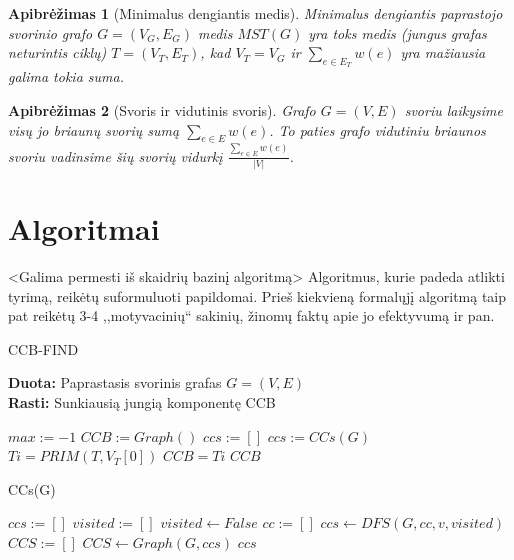 \documentclass[bibliography=totoc]{article}
\newtheorem{definition}{Apibrėžimas}
\begin{document}
\begin{definition}[Minimalus dengiantis medis]\citep{Graf}
Minimalus dengiantis paprastojo svorinio grafo $G=(V_G, E_G)$ medis $MST(G)$ yra toks medis (jungus grafas neturintis ciklų) $T=(V_T, E_T)$, kad $V_T=V_G$ ir $\sum_{e\in E_T}{w(e)}$ yra mažiausia galima tokia suma.
\end{definition}

\begin{definition}[Svoris ir vidutinis svoris]
Grafo $G=(V,E)$ svoriu laikysime visų jo briaunų svorių sumą $\sum_{e\in E}{w(e)}$. To paties grafo vidutiniu briaunos svoriu vadinsime šių svorių vidurkį $\frac{\sum_{e\in E}{w(e)}}{\vert V \vert}$.
\end{definition}
\newpage
\section{Algoritmai}
<Galima permesti iš skaidrių bazinį algoritmą>
Algoritmus, kurie padeda atlikti tyrimą, reikėtų suformuluoti papildomai. 
Prieš kiekvieną formalųjį algoritmą taip pat reikėtų 3-4 ,,motyvacinių`` sakinių,
žinomų faktų apie jo efektyvumą ir pan.


\begin{algorithm}[h]
    \caption{CCB-FIND}
    \textbf{Duota:} Paprastasis svorinis grafas $G=(V,E)$\\
    \textbf{Rasti:} Sunkiausią jungią komponentę CCB
    \begin{algorithmic}[1]
        \STATE $max := -1$
        \STATE $CCB := Graph()$
        \STATE $ccs := []$
        \STATE $ccs := CCs(G)$
            \STATE $Ti = PRIM(T,V_T[0])$
                \STATE $CCB = Ti$
            \ENDIF
        \ENDFOR
        \RETURN $CCB$
    \end{algorithmic}
\end{algorithm}

\begin{algorithm}[h]\citep{slides}
    \caption{CCs(G)}
    \begin{algorithmic}[1]
        \STATE $ccs := []$
        \STATE $visited := []$
            \STATE $visited \leftarrow False$
        \ENDFOR
                \STATE $cc := []$
                \STATE $ccs \leftarrow DFS(G,cc,v,visited)$
            \ENDIF
        \ENDFOR
        \STATE $CCS := []$
            \STATE $CCS\leftarrow Graph(G,ccs)$
        \ENDFOR
        \RETURN $ccs$
    \end{algorithmic}
\end{algorithm}
\end{document}

